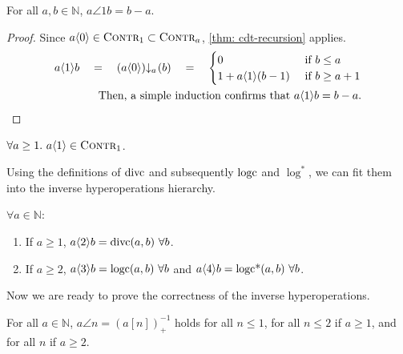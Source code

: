 \begin{lem}
For all $a, b\in \mathbb{N}$, $a\angle{1}b = b - a$.
\end{lem}
\begin{proof}
Since $a\langle 0\rangle \in \text{\scshape{Contr}}_1 \subset \text{\scshape{Contr}}_{a}$, \cref{thm: cdt-recursion} applies.
\begin{equation*}
\begin{split}
a\angle{1}b \quad = \quad \cdt{\left(a\angle{0}\right)}{a}(b) \quad = \quad \begin{cases}
0 & \text{ if } b\le a \\ 1 + a\angle{1}(b - 1) & \text{ if } b\ge a+1 \end{cases} \\
\text{Then, a simple induction confirms that } a\angle{1}b = b - a.
\end{split}
\end{equation*}
\end{proof}
\begin{col} \label{col: inv-hyperop-1-contr1}
$\forall a \ge 1.~ a\langle 1\rangle \in \text{\scshape{Contr}}_1$.
\end{col}
Using the definitions of $\text{divc}$ and subsequently $\text{logc}$ and $\log^*$, we can fit them into the inverse hyperoperations hierarchy.
\begin{col} \label{col: inv-hyperop-234}
{\color{magenta}$\forall a \in \mathbb{N}$}:
\begin{enumerate}
	\item If $a\ge 1$, $a\langle 2\rangle b = \text{divc}(a, b) \ \forall b$.
	\item If $a\ge 2$, $a\langle 3\rangle b = \text{logc}(a, b) \ \forall b$ and $a\langle 4\rangle b = \text{logc*}(a, b) \ \forall b$.
\end{enumerate}
\end{col}
Now we are ready to prove the correctness of the inverse hyperoperations.
\begin{thm} \label{thm: inv-hyperop-correct}
{\color{magenta}For all $a\in \mathbb{N}$, $a\angle{n} = \left(a[n]\right)^{-1}_+$ holds for all $n\le 1$, for all $n \le 2$ if $a\ge 1$, and for all $n$ if $a\ge 2$.}
\end{thm}

